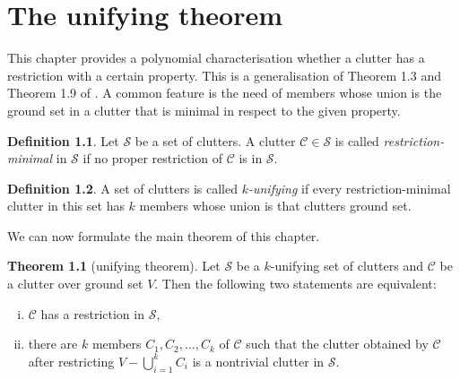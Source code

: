 \documentclass[a4paper, 12pt]{scrbook}
\theoremstyle{definition}
\newtheorem*{definition}{Definition}
\newtheorem{theorem}{Theorem}[chapter]
\begin{document}
\chapter{The unifying theorem}
This chapter provides a polynomial characterisation whether a clutter has a restriction with a certain property.
This is a generalisation of Theorem 1.3 and Theorem 1.9 of \cite{restrictions}.
A common feature is the need of members whose union is the ground set in a clutter that is minimal in respect to the given property.
   \begin{definition}
       Let $\mathcal{S}$ be a set of clutters.
       A clutter $\mathcal{C} \in \mathcal{S}$ is called \emph{restriction-minimal} in $\mathcal{S}$ if no proper restriction of $\mathcal{C}$ is in $\mathcal{S}$.
   \end{definition}

   \begin{definition}
       A set of clutters is called \emph{$k$-unifying} if every restriction-minimal clutter in this set has $k$ members whose union is that clutters ground set.
   \end{definition}

   We can now formulate the main theorem of this chapter.

   \begin{theorem}[unifying theorem]\label{unifying}
       Let $\mathcal{S}$ be a $k$-unifying set of clutters and $\mathcal{C}$ be a clutter over ground set $V$.
       Then the following two statements are equivalent:
       \leavevmode
       \begin{enumerate}[(i)]
           \item $\mathcal{C}$ has a restriction in $\mathcal{S}$,
           \item there are $k$ members $C_1, C_2, \ldots, C_k$ of $\mathcal{C}$ such that the clutter obtained by $\mathcal{C}$ after restricting $V - \bigcup_{i=1}^k C_i$ is a nontrivial clutter in $\mathcal{S}$.
       \end{enumerate}
   \end{theorem}
\end{document}
